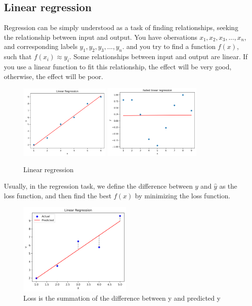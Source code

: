 \documentclass[oneside]{book}
\begin{document}
\subsection{Linear regression}
Regression can be simply understood as a task of finding relationships, seeking the relationship between input and output. 
You have obersations $x_1,x_2,x_3,...,x_n$, and corresponding labels $y_1,y_2,y_3,...,y_n$. and you try to find a function $f(x)$, such that $f(x_i) \approx y_i$. 
Some relationships between input and output are linear. If you use a linear function to fit this relationship, the effect will be very good, otherwise, the effect will be poor.
\begin{figure}[H]
        \centering
        \includegraphics[width=0.4\textwidth]{images/linear regression.png}
        \includegraphics[width=0.43\textwidth]{images/failed linear regression.png}
        \caption{Linear regression}
        
\end{figure}
Usually, in the regression task, we define the difference between $y$ and $\hat{y}$ as the loss function, and then find the best $f(x)$ by minimizing the loss function.
\begin{figure}[H]
        \centering
        \includegraphics[width=0.5\textwidth]{images/y and predicted.png}
        \caption{Loss is the summation of the difference between y and predicted y}
        \label{fig:loss1}
\end{figure}
\end{document}
